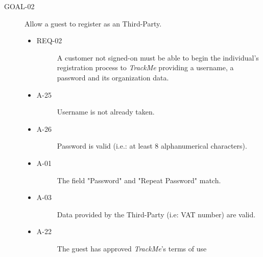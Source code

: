 \documentclass[a4paper]{article}
\newcommand{\requirement}{\ding{229}}%
\begin{document}
        \begin{description}
        	\item[GOAL-02] Allow a guest to register as an Third-Party.
            	\begin{itemize}
            	    \item[\requirement]
                	\begin{description}
                	\item[REQ-02]  A customer not signed-on must be able to begin the individual's registration process to \textit{TrackMe} providing a username, a password and its organization data.
                	\end{description}
                	\item
                	\begin{description}
                	\item[A-25] Username is not already taken.
                	\end{description}
                	\item
                	\begin{description}
                	\item[A-26] Password is valid (i.e.: at least 8 alphanumerical characters).
                	\end{description}
                	\item
                	\begin{description}
                	\item[A-01] The field "Password" and "Repeat Password" match.
                	\end{description}
            	    \item
                	\begin{description}
                	\item[A-03] Data provided by the Third-Party (i.e: VAT number) are valid.
                	\end{description}
                	\item
                	\begin{description}
                	\item[A-22] The guest has approved \textit{TrackMe}'s terms of use
                	\end{description}
                \end{itemize}
        \end{description}
        
\end{document}
